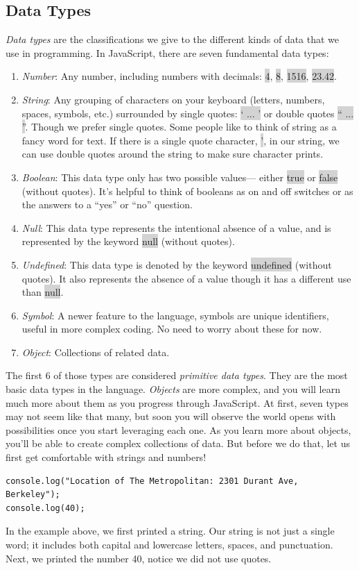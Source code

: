 \documentclass[11pt]{article}
\begin{document}
\subsection{Data Types}
\textit{Data types} are the classifications we give to the different kinds of data that we use in programming. In JavaScript, there are seven fundamental data types:
\begin{enumerate}[leftmargin = *]
\item \textit{Number}: Any number, including numbers with decimals: \colorbox{lightgray}{4}, \colorbox{lightgray}{8}, \colorbox{lightgray}{1516}, \colorbox{lightgray}{23.42}.
\item \textit{String}: Any grouping of characters on your keyboard (letters, numbers, spaces, symbols, etc.) surrounded by single quotes: \colorbox{lightgray}{` ... '} or double quotes \colorbox{lightgray}{`` ... ''}. Though we prefer single quotes. Some people like to think of string as a fancy word for text. If there is a single quote character, \colorbox{lightgray}{'}, in our string, we can use double quotes around the string to make sure character prints.
\item \textit{Boolean}: This data type only has two possible values— either \colorbox{lightgray}{true} or \colorbox{lightgray}{false} (without quotes). It’s helpful to think of booleans as on and off switches or as the answers to a “yes” or “no” question. 
\item \textit{Null}: This data type represents the intentional absence of a value, and is represented by the keyword \colorbox{lightgray}{null} (without quotes).
\item \textit{Undefined}: This data type is denoted by the keyword \colorbox{lightgray}{undefined} (without quotes). It also represents the absence of a value though it has a different use than \colorbox{lightgray}{null}.
\item \textit{Symbol}: A newer feature to the language, symbols are unique identifiers, useful in more complex coding. No need to worry about these for now.
\item \textit{Object}: Collections of related data.
\end{enumerate}
The first 6 of those types are considered \textit{primitive data types}. They are the most basic data types in the language. \textit{Objects} are more complex, and you will learn much more about them as you progress through JavaScript. At first, seven types may not seem like that many, but soon you will observe the world opens with possibilities once you start leveraging each one. As you learn more about objects, you’ll be able to create complex collections of data. But before we do that, let us first get comfortable with strings and numbers!
\begin{lstlisting}
console.log("Location of The Metropolitan: 2301 Durant Ave, Berkeley");
console.log(40);
\end{lstlisting}
In the example above, we first printed a string. Our string is not just a single word; it includes both capital and lowercase letters, spaces, and punctuation. Next, we printed the number 40, notice we did not use quotes.
\end{document}

